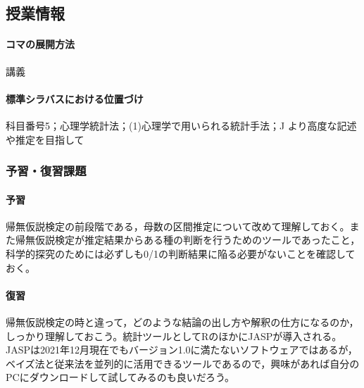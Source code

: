 \subsection{授業情報}
\paragraph{コマの展開方法}
講義
\paragraph{標準シラバスにおける位置づけ}
科目番号5；心理学統計法；(1)心理学で用いられる統計手法；J より高度な記述や推定を目指して
\subsubsection{予習・復習課題}
\paragraph{予習}帰無仮説検定の前段階である，母数の区間推定について改めて理解しておく。また帰無仮説検定が推定結果からある種の判断を行うためのツールであったこと，科学的探究のためには必ずしも0/1の判断結果に陥る必要がないことを確認しておく。
\paragraph{復習}帰無仮説検定の時と違って，どのような結論の出し方や解釈の仕方になるのか，しっかり理解しておこう。統計ツールとしてRのほかにJASPが導入される。JASPは2021年12月現在でもバージョン1.0に満たないソフトウェアではあるが，ベイズ法と従来法を並列的に活用できるツールであるので，興味があれば自分のPCにダウンロードして試してみるのも良いだろう。
